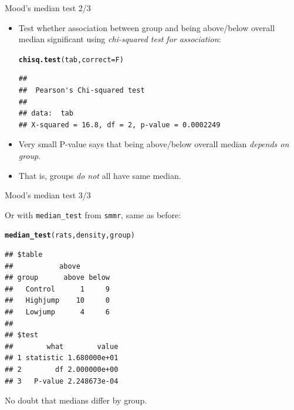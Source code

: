\documentclass[unknownkeysallowed]{beamer}\usepackage[]{graphicx}\usepackage[]{color}
\makeatletter
\newcommand{\hlstd}[1]{\textcolor[rgb]{0.345,0.345,0.345}{#1}}%
\newcommand{\hlkwc}[1]{\textcolor[rgb]{0.333,0.667,0.333}{#1}}%
\newcommand{\hlkwd}[1]{\textcolor[rgb]{0.737,0.353,0.396}{\textbf{#1}}}%
\newenvironment{kframe}{%
 \def\at@end@of@kframe{}%
 \ifinner\ifhmode%
  \def\at@end@of@kframe{\end{minipage}}%
  \begin{minipage}{\columnwidth}%
 \fi\fi%
 \def\FrameCommand##1{\hskip\@totalleftmargin \hskip-\fboxsep
 \colorbox{shadecolor}{##1}\hskip-\fboxsep
     \hskip-\linewidth \hskip-\@totalleftmargin \hskip\columnwidth}%
 \MakeFramed {\advance\hsize-\width
   \@totalleftmargin\z@ \linewidth\hsize
   \@setminipage}}%
 {\par\unskip\endMakeFramed%
 \at@end@of@kframe}
\newenvironment{knitrout}{}{} %
\makeatother
\begin{document}
\begin{frame}[fragile]{Mood's median test 2/3}
  
  \begin{itemize}
  \item Test whether association between group and being above/below
    overall median significant using \emph{chi-squared test for association}:
    
\begin{knitrout}
\color{fgcolor}\begin{kframe}
\begin{alltt}
\hlkwd{chisq.test}\hlstd{(tab,}\hlkwc{correct}\hlstd{=F)}
\end{alltt}
\begin{verbatim}
## 
## 	Pearson's Chi-squared test
## 
## data:  tab
## X-squared = 16.8, df = 2, p-value = 0.0002249
\end{verbatim}
\end{kframe}
\end{knitrout}

\item Very small P-value says that being above/below overall median
  \emph{depends on group}.
\item That is, groups \emph{do not} all have same median.
  
  \end{itemize}
  
\end{frame}

\begin{frame}[fragile]{Mood's median test 3/3}
  
  Or with \texttt{median\_test} from \texttt{smmr}, same as before:
  
\begin{knitrout}
\color{fgcolor}\begin{kframe}
\begin{alltt}
\hlkwd{median_test}\hlstd{(rats,density,group)}
\end{alltt}
\begin{verbatim}
## $table
##           above
## group      above below
##   Control      1     9
##   Highjump    10     0
##   Lowjump      4     6
## 
## $test
##        what        value
## 1 statistic 1.680000e+01
## 2        df 2.000000e+00
## 3   P-value 2.248673e-04
\end{verbatim}
\end{kframe}
\end{knitrout}

No doubt that medians differ by group.
  
\end{frame}
\end{document}
